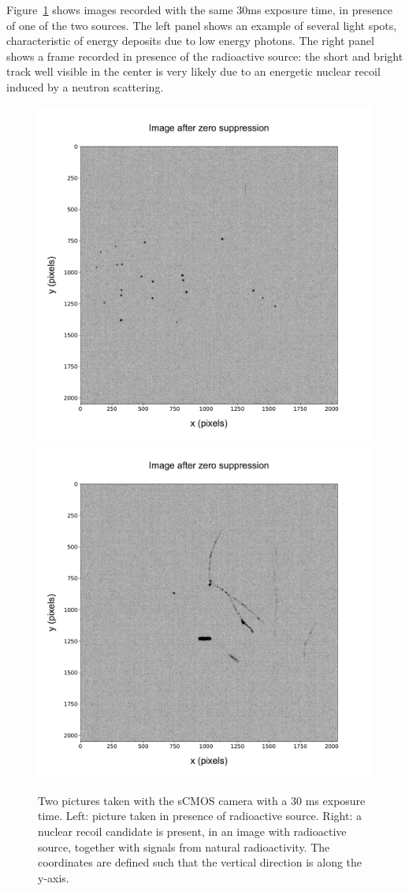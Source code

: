 \documentclass[12pt]{iopart}
\begin{document}
Figure~\ref{fig:signals} shows images recorded with the same
30\unit{ms} exposure time, in presence of one of the two sources. The
left panel shows an example of several light spots, characteristic of
energy deposits due to \fe low energy photons.  The right panel shows
a frame recorded in presence of the \ambe radioactive source: the
short and bright track well visible in the center is very likely due
to an energetic nuclear recoil induced by a neutron scattering.
% 
\begin{figure}[ht]
  \begin{center}
    \includegraphics[width=0.49\linewidth]{figures/pic_run01843_ev93_oriIma_paper}
    \includegraphics[width=0.49\linewidth]{figures/pic_run02317_ev342_oriIma_paper}
    \caption{Two pictures taken with the sCMOS camera with a 30 ms
      exposure time. Left: picture taken in presence of \fe
      radioactive source. Right: a nuclear recoil candidate is
      present, in an image with \ambe radioactive source, together
      with signals from natural radioactivity.  The coordinates are
      defined such that the vertical direction is along the
      y-axis.  \label{fig:signals}}
  \end{center}
\end{figure}
\end{document}
